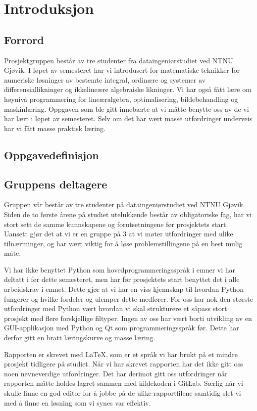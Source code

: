 \section{Introduksjon}

\subsection{Forrord}
Prosjektgruppen består av tre studenter fra dataingeniørstudiet ved NTNU Gjøvik. I løpet av 
semesteret har vi introdusert for matematiske teknikker for numeriske løsninger av bestemte 
integral, ordinære og systemer av differensiallikninger og ikkelineære algebraiske likninger. 
Vi har også fått lære om høynivå programmering for lineæralgebra, optimalisering, bildebehandling 
og maskinlæring. Oppgaven som ble gitt innebærte at vi måtte benytte oss av de vi har lært i løpet
av semesteret. Selv om det har vært masse utfordringer underveis har vi fått masse praktisk 
læring. 

\subsection{Oppgavedefinisjon}

\subsection{Gruppens deltagere}
Gruppen vår består av tre studenter på dataingeniørstudiet ved NTNU Gjøvik. Siden de to første årene på
studiet utelukkende består av obligatoriske fag, har vi stort sett de samme kunnskapene og 
forutsetningene før prosjektets start. Uansett gjør det at vi er en gruppe på 3 at vi møter utfordringer
med ulike tilnærminger, og har vært viktig for å løse problemstillingene på en best mulig måte.

Vi har ikke benyttet Python som hovedprogrammeringsspråk i emner vi har deltatt i før dette semesteret,
men har før prosjektets start benyttet det i alle arbeidskrav i emnet. Dette gjør at vi har en viss 
kjennskap til hvordan Python fungerer og hvilke fordeler og ulemper dette medfører. For oss har nok den 
største utfordringer med Python vært hvordan vi skal strukturere et såpass stort prosjekt med flere 
forskjellige filtyper. Ingen av oss har vært borti utvikling av en GUI-applikasjon med Python og Qt som 
programmeringsspråk før. Dette har derfor gitt en bratt læringskurve og masse læring.

Rapporten er skrevet med LaTeX, som er et språk vi har brukt på et mindre prosjekt tidligere på studiet.
Når vi har skrevet rapporten har det ikke gitt oss noen nevneverdige utfordringer. Det har derimot gitt
oss utfordringer når rapporten måtte holdes lagret sammen med kildekoden i GitLab. Særlig når vi skulle
finne en god editor for å jobbe på de ulike rapportfilene samtidig slet vi med å finne en løsning som 
vi synes var effektiv.

